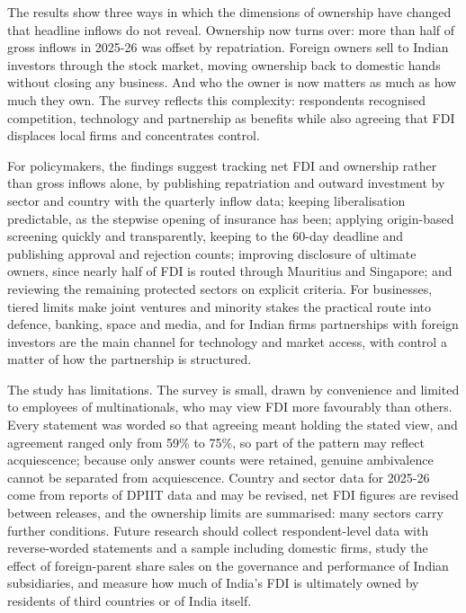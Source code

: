 \documentclass[sn-basic]{sn-jnl}
\begin{document}
The results show three ways in which the dimensions of ownership have changed that headline inflows do not reveal. Ownership now turns over: more than half of gross inflows in 2025-26 was offset by repatriation. Foreign owners sell to Indian investors through the stock market, moving ownership back to domestic hands without closing any business. And who the owner is now matters as much as how much they own. The survey reflects this complexity: respondents recognised competition, technology and partnership as benefits while also agreeing that FDI displaces local firms and concentrates control.

For policymakers, the findings suggest tracking net FDI and ownership rather than gross inflows alone, by publishing repatriation and outward investment by sector and country with the quarterly inflow data; keeping liberalisation predictable, as the stepwise opening of insurance has been; applying origin-based screening quickly and transparently, keeping to the 60-day deadline and publishing approval and rejection counts; improving disclosure of ultimate owners, since nearly half of FDI is routed through Mauritius and Singapore; and reviewing the remaining protected sectors on explicit criteria. For businesses, tiered limits make joint ventures and minority stakes the practical route into defence, banking, space and media, and for Indian firms partnerships with foreign investors are the main channel for technology and market access, with control a matter of how the partnership is structured.

The study has limitations. The survey is small, drawn by convenience and limited to employees of multinationals, who may view FDI more favourably than others. Every statement was worded so that agreeing meant holding the stated view, and agreement ranged only from 59\% to 75\%, so part of the pattern may reflect acquiescence; because only answer counts were retained, genuine ambivalence cannot be separated from acquiescence. Country and sector data for 2025-26 come from reports of DPIIT data and may be revised, net FDI figures are revised between releases, and the ownership limits are summarised: many sectors carry further conditions. Future research should collect respondent-level data with reverse-worded statements and a sample including domestic firms, study the effect of foreign-parent share sales on the governance and performance of Indian subsidiaries, and measure how much of India's FDI is ultimately owned by residents of third countries or of India itself.
\end{document}
